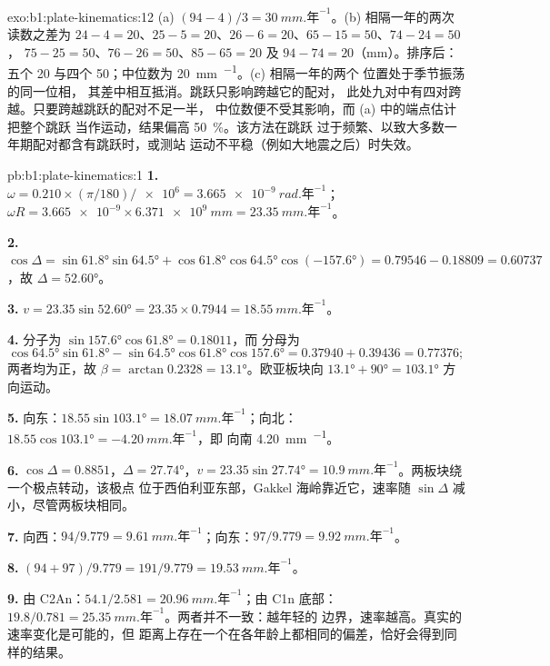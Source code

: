 \begin{solution}{exo:b1:plate-kinematics:12}
(a) $(94 - 4)/3 = \qty{30}{mm.\text{年}^{-1}}$。(b) 相隔一年的两次读数之差为
$24 - 4 = 20$、$25 - 5 = 20$、$26 - 6 = 20$、$65 - 15 = 50$、$74 - 24 = 50$，
$75 - 25 = 50$、$76 - 26 = 50$、$85 - 65 = 20$ 及 $94 - 74 = 20$（mm）。排序后：
五个 20 与四个 50；中位数为 \qty{20}{mm.^{-1}}。(c) 相隔一年的两个
位置处于季节振荡的同一位相，
其差中相互抵消。跳跃只影响跨越它的配对，
此处九对中有四对跨越。只要跨越跳跃的配对不足一半，
中位数便不受其影响，而 (a) 中的端点估计把整个跳跃
当作运动，结果偏高 \qty{50}{\percent}。该方法在跳跃
过于频繁、以致大多数一年期配对都含有跳跃时，或测站
运动不平稳（例如大地震之后）时失效。
\end{solution}

\begin{solution}{pb:b1:plate-kinematics:1}
\textbf{1.} $\omega = 0.210\times(\pi/180)/\num{e6} = \qty{3.665e-9}{rad.\text{年}^{-1}}$；
$\omega R = \num{3.665e-9}\times\qty{6.371e9}{mm} = \qty{23.35}{mm.\text{年}^{-1}}$。

\textbf{2.} $\cos\Delta = \sin\ang{61.8}\sin\ang{64.5} + \cos\ang{61.8}
\cos\ang{64.5}\cos(\ang{-157.6}) = 0.79546 - 0.18809 = 0.60737$，故
$\Delta = \ang{52.60}$。

\textbf{3.} $v = 23.35\sin\ang{52.60} = 23.35\times0.7944 =
\qty{18.55}{mm.\text{年}^{-1}}$。

\textbf{4.} 分子为 $\sin\ang{157.6}\cos\ang{61.8} = 0.18011$，而
分母为
\[
  \cos\ang{64.5}\sin\ang{61.8} - \sin\ang{64.5}\cos\ang{61.8}\cos\ang{157.6} =
  0.37940 + 0.39436 = 0.77376;
\]
两者均为正，故 $\beta = \arctan 0.2328 =
\ang{13.1}$。欧亚板块向 $\ang{13.1} + \ang{90} = \ang{103.1}$ 方向运动。

\textbf{5.} 向东：$18.55\sin\ang{103.1} = \qty{18.07}{mm.\text{年}^{-1}}$；向北：
$18.55\cos\ang{103.1} = \qty{-4.20}{mm.\text{年}^{-1}}$，即
向南 \qty{4.20}{mm.^{-1}}。

\textbf{6.} $\cos\Delta = 0.8851$，$\Delta = \ang{27.74}$，$v = 23.35
\sin\ang{27.74} = \qty{10.9}{mm.\text{年}^{-1}}$。两板块绕一个极点转动，该极点
位于西伯利亚东部，Gakkel 海岭靠近它，速率随
$\sin\Delta$ 减小，尽管两板块相同。

\textbf{7.} 向西：$94/9.779 = \qty{9.61}{mm.\text{年}^{-1}}$；向东：$97/9.779 =
\qty{9.92}{mm.\text{年}^{-1}}$。

\textbf{8.} $(94 + 97)/9.779 = 191/9.779 = \qty{19.53}{mm.\text{年}^{-1}}$。

\textbf{9.} 由 C2An：$54.1/2.581 = \qty{20.96}{mm.\text{年}^{-1}}$；由
C1n 底部：$19.8/0.781 = \qty{25.35}{mm.\text{年}^{-1}}$。两者并不一致：越年轻的
边界，速率越高。真实的速率变化是可能的，但
距离上存在一个在各年龄上都相同的偏差，恰好会得到同样的结果。


\end{solution}
